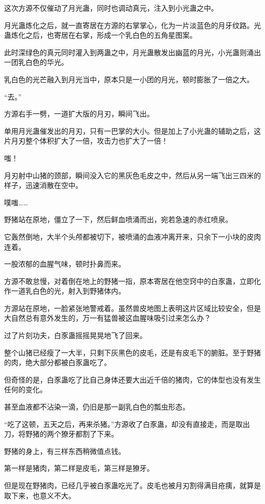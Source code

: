 \begin{this_body}
这次方源不仅催动了月光蛊，同时也调动真元，注入到小光蛊之中。

月光蛊炼化之后，就一直寄居在方源的右掌掌心，化为一片淡蓝色的月牙纹路。光蛊炼化之后，也寄居在右掌，形成一个乳白色的五角星图案。

此时深绿色的真元同时灌入到两蛊之中，月光蛊散发出幽蓝的月光，小光蛊则涌出一团乳白色的华光。

乳白色的光芒融入到月光当中，原本只是一小团的月光，顿时膨胀了一倍之大。

“去。”

方源右手一劈，一道扩大版的月刃，瞬间飞出。

单用月光蛊催发出的月刃，只有一巴掌的大小。但是加上了小光蛊的辅助之后，这片月刃整个体积扩大了一倍，攻击力也扩大了一倍！

嗤！

月刃射中山猪的颈部，瞬间没入它的黑灰色毛皮之中，然后从另一端飞出三四米的样子，迅速消散在空中。

噗嗤……

野猪站在原地，僵立了一下，然后鲜血喷涌而出，宛若急速的赤红喷泉。

它轰然倒地，大半个头颅都被切下，被喷涌的血液冲离开来，只余下一小块的皮肉连着。

一股浓郁的血腥气味，顿时扑鼻而来。

方源不敢怠慢，对着倒在地上的野猪一指，原本寄居在他空窍中的白豕蛊，立即化作一道乳白色的光，射入到野猪体内。

方源站在原地，一脸紧张地警戒着。虽然兽皮地图上表明这片区域比较安全，但是大自然总有意外发生的，万一有猛兽被这血腥味吸引过来怎么办？

过了片刻功夫，白豕蛊摇摇晃晃地飞了回来。

整个山猪已经瘦了一大半，只剩下灰黑色的皮毛，还是有皮毛下的腑脏。至于野猪的肉，绝大部分都被白豕蛊吃了。

但奇怪的是，白豕蛊吃了比自己身体还要大出近千倍的猪肉，它的体型也没有发生任何的变化。

甚至血液都不沾染一滴，仍旧是那一副乳白色的瓢虫形态。

“吃了这顿，五天之后，再来杀猪。”方源收了白豕蛊，却没有直接走，而是取出刀，将野猪的两个獠牙都割了下来。

野猪的身上，有三样东西稍微值点钱。

第一样是猪肉，第二样是皮毛，第三样是獠牙。

但是现在野猪肉，已经几乎被白豕蛊吃光了。皮毛也被月刃割得满目疮痍，就算是取下来，也意义不大。


\end{this_body}
